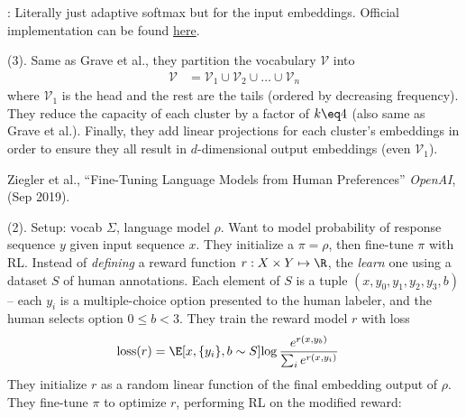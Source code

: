 \documentclass[11pt]{article}
\begin{document}
: Literally just adaptive softmax but for the input embeddings. Official implementation can be found \href{https://github.com/pytorch/fairseq/blob/master/fairseq/modules/adaptive_input.py}{here}. 


 (3). Same as Grave et al., they partition the vocabulary $\mathcal V$ into
\begin{align}
\mathcal V &= \mathcal V_1 \cup \mathcal V_2 \cup \ldots \cup  \mathcal V_n
\end{align}
where $\mathcal V_1$ is the head and the rest are the tails (ordered by decreasing frequency). They reduce the capacity of each cluster by a factor of $k \eq 4$ (also same as Grave et al.). Finally, they add linear projections for each cluster's embeddings in order to ensure they all result in $d$-dimensional output embeddings (even $\mathcal V_1$). 







\vspace{-1em}
{\footnotesize Ziegler et al., ``Fine-Tuning Language Models from Human Preferences'' \textit{OpenAI}, (Sep 2019).}


 (2). Setup: vocab $\Sigma$, language model $\rho$. Want to model probability of response sequence $y$ given input sequence $x$.  They initialize a  $\pi = \rho$, then fine-tune $\pi$ with RL. Instead of \textit{defining} a reward function $r: X \times Y \mapsto \R$, the \textit{learn} one using a dataset $S$ of human annotations. Each element of $S$ is a tuple $(x, y_0, y_1, y_2, y_3, b)$ -- each $y_i$ is a multiple-choice option presented to the human labeler, and the human selects option $0 \le b < 3$. They train the reward model $r$ with loss
\begin{align}
\text{loss}(r)
&= \E[x, \{y_i\}, b \sim S]{\log \frac{ e^{r(x, y_b)} }{ \sum_i e^{r(x, y_i)}   }}
\end{align}
They initialize $r$ as a random linear function of the final embedding output of $\rho$. They fine-tune $\pi$ to optimize $r$, performing RL on the modified reward:
\end{document}
